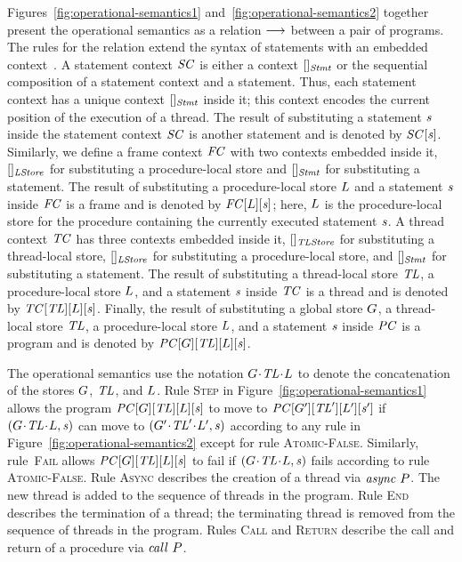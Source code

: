 Figures~\ref{fig:operational-semantics1} and~\ref{fig:operational-semantics2} together present the operational semantics as a relation 
$\longrightarrow$ between a pair of programs.
The rules for the relation extend the syntax of statements with an embedded context~\cite{WrightF94}.
A statement context $\mathit{SC}$ is either a context $[]_{\mathit{Stmt}}$ or the sequential composition of a 
statement context and a statement.
Thus, each statement context has a unique context $[]_{\mathit{Stmt}}$ inside it;
this context encodes the current position of the execution of a thread.
The result of substituting a statement $\mathit{s}$ inside the statement context $\mathit{SC}$ 
is another statement and is denoted by $\mathit{SC}[\mathit{s}]$.
Similarly, we define a frame context $\mathit{FC}$ with two contexts embedded inside it, 
$[]_{\mathit{LStore}}$ for substituting a procedure-local store
and $[]_{\mathit{Stmt}}$ for substituting a statement.
The result of substituting a procedure-local store $L$ and a statement $\mathit{s}$ inside 
$\mathit{FC}$ is a frame and is denoted by $\mathit{FC}[L][\mathit{s}]$;
here, $L$ is the procedure-local store for the procedure containing the currently executed statement $\mathit{s}$.
A thread context $\mathit{TC}$ has three contexts embedded inside it, $[]_{\mathit{TLStore}}$ for substituting a thread-local store, 
$[]_{\mathit{LStore}}$ for substituting a procedure-local store, and $[]_{\mathit{Stmt}}$ for substituting a statement.
The result of substituting a thread-local store $\mathit{TL}$, a procedure-local store $L$, and a statement $\mathit{s}$ inside $\mathit{TC}$ 
is a thread and is denoted by $\mathit{TC}[\mathit{TL}][L][\mathit{s}]$.
Finally, the result of substituting a global store $G$, a thread-local store $\mathit{TL}$, a procedure-local store $L$, and a statement $\mathit{s}$ inside $\mathit{PC}$ is a program and is denoted by $\mathit{PC}[G][\mathit{TL}][L][\mathit{s}]$.

The operational semantics use the notation ${G}\!\cdot\!{\mathit{TL}}\!\cdot\!{L}$ to denote the concatenation of the 
stores $G$, $\mathit{TL}$, and $L$.
Rule \textsc{Step} in Figure~\ref{fig:operational-semantics1} allows the program $\mathit{PC}[G][\mathit{TL}][L][\mathit{s}]$ to move 
to $\mathit{PC}[G'][\mathit{TL}'][L'][\mathit{s}']$
if $({G}\!\cdot\!{\mathit{TL}}\!\cdot\!{L}, \mathit{s})$ can move to $({G'}\!\cdot\!{\mathit{TL}'}\!\cdot\!{L'}, \mathit{s})$ 
according to any rule in Figure~\ref{fig:operational-semantics2} except for rule \textsc{Atomic-False}.
Similarly, rule~\textsc{Fail} allows $\mathit{PC}[G][\mathit{TL}][L][\mathit{s}]$ to fail if $({G}\!\cdot\!{\mathit{TL}}\!\cdot\!{L}, \mathit{s})$
fails according to rule \textsc{Atomic-False}. 
Rule \textsc{Async} describes the creation of a thread via $\mathit{async}\ P$.  
The new thread is added to the sequence of threads in the program.
Rule \textsc{End} describes the termination of a thread; the terminating thread is removed
from the sequence of threads in the program.
Rules \textsc{Call} and \textsc{Return} describe the call and return of a procedure via $\mathit{call}\ P$.

